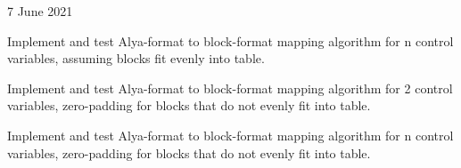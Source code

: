 7 June 2021
\begin{DoxyItemize}
\item Implement and test Alya-\/format to block-\/format mapping algorithm for n control variables, assuming blocks fit evenly into table.
\item Implement and test Alya-\/format to block-\/format mapping algorithm for 2 control variables, zero-\/padding for blocks that do not evenly fit into table.
\item Implement and test Alya-\/format to block-\/format mapping algorithm for n control variables, zero-\/padding for blocks that do not evenly fit into table. 
\end{DoxyItemize}